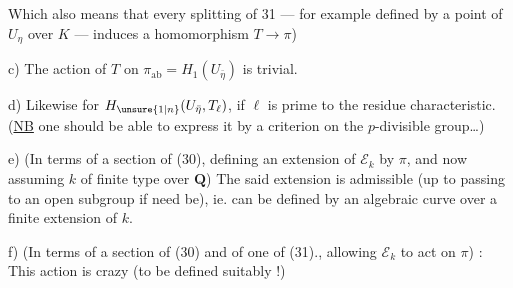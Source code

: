 Which also means that every  splitting
of 31 --- for example defined by a point of $U_\eta$
 over $K$ --- induces a homomorphism $T\longrightarrow\pi$)

\noindent c) The action of $T$ on $\pi_{\mathrm{ab}}=H_1(U_{\bar\eta})$ is
trivial.

\noindent d) Likewise for $H_{\unsure{1|n}}(U_{\bar\eta},T_\ell)$, if $\ell$ is prime
to the residue characteristic. (\uline{NB}  \unsure{,|)}
one should be able to express it by a criterion
on the $p$-divisible group\ldots)

\noindent e) (In terms of a section of (30),
defining an extension of $\mathcal E_k$ by $\pi$,
and now assuming $k$ of finite
type over $\mathbf Q$) The said extension is
admissible (up to passing to an
open subgroup  if need be), ie.
can be defined by an algebraic curve
over  a finite extension of $k$.

\noindent f) (In terms of a section of (30)
and of one of (31)., allowing
$\mathcal E_k$ to act on $\pi$) : This
action is   crazy (to be defined suitably !)%
